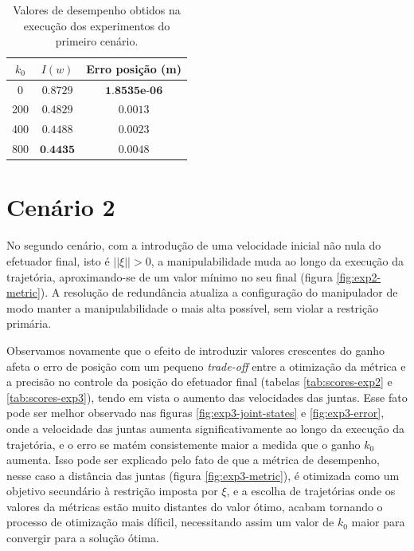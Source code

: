 \begin{table}[htbp]
    \centering
    \begin{tabular}{ccc}
        \toprule
        \( k_0 \) & \( I(w) \)  & Erro posição (m) \\
        \midrule
        0  & \( 0.8729 \) & \( \textbf{1.8535e-06} \) \\
        200  & \( 0.4829 \) & \( 0.0013 \) \\
        400  & \( 0.4488 \) & \( 0.0023 \) \\
        800  & \( \textbf{0.4435} \) & \( 0.0048 \) \\
        \bottomrule
    \end{tabular}
    \caption{Valores de desempenho obtidos na execução dos experimentos do primeiro cenário.}
    \label{tab:scores-exp1}
\end{table}

\section{Cenário 2}
	
No segundo cenário, com a introdução de uma velocidade inicial não nula do efetuador final, isto é \(||\xi|| > 0 \), 
a manipulabilidade muda ao longo da execução da trajetória, aproximando-se de um valor mínimo no seu final (figura \ref*{fig:exp2-metric}). 
A resolução de redundância atualiza a configuração do manipulador de modo manter a manipulabilidade o mais 
alta possível, sem violar a restrição primária.

Observamos novamente que o efeito de introduzir valores crescentes do ganho afeta o erro de posição 
com um pequeno \emph{trade-off} entre a otimização da métrica e a precisão no controle da posição 
do efetuador final (tabelas \ref*{tab:scores-exp2} e \ref*{tab:scores-exp3}), tendo em vista o aumento das 
velocidades das juntas. Esse fato pode ser melhor observado nas figuras \ref*{fig:exp3-joint-states} e 
\ref*{fig:exp3-error}, onde a velocidade das juntas aumenta significativamente ao longo da execução da trajetória, 
e o erro se matém consistemente maior a medida que o ganho \(k_0\) aumenta. Isso pode ser explicado pelo fato 
de que a métrica de desempenho, nesse caso a distância das juntas (figura \ref*{fig:exp3-metric}), é otimizada como um objetivo secundário 
à restrição imposta por \(\xi\), e a escolha de trajetórias onde os valores da métricas estão muito distantes
 do valor ótimo, acabam tornando o processo de otimização mais díficil, necessitando assim um valor de \(k_0\) 
 maior para convergir para a solução ótima.

